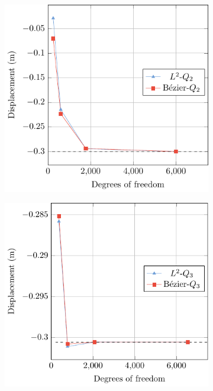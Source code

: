 \documentclass[preprint,12pt]{elsarticle}
\theoremstyle{remark}
\begin{document}
\begin{figure}[!hbt]
    \centering
    \captionsetup[subfigure]{font = footnotesize}
    \begin{subfigure}[b]{.32\textwidth}
        \centering
        \includegraphics[width = \textwidth]{Scordelis-Lo-p=2}
        \caption{}
    \end{subfigure}
    \begin{subfigure}[b]{.32\textwidth}
        \centering
        \includegraphics[width = \textwidth]{Scordelis-Lo-p=3}

\end{subfigure}
\end{figure}
\end{document}

